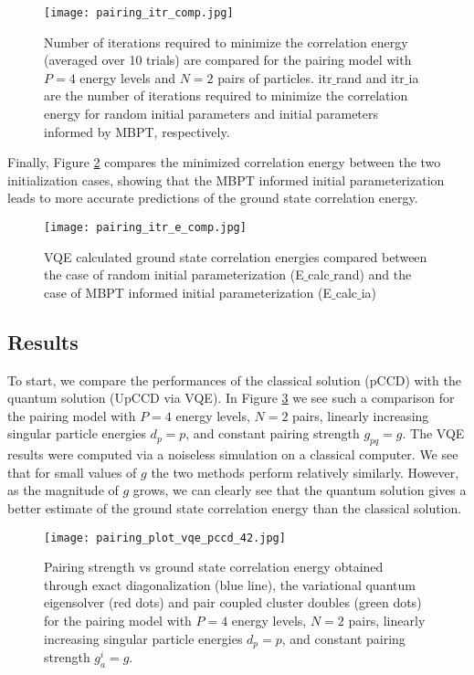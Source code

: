 \documentclass[Dual]{msu-thesis}
\begin{document}
\begin{figure}[H]
    \centering
    \texttt{[image: pairing\_itr\_comp.jpg]}
    \caption{Number of iterations required to minimize the correlation energy (averaged over 10 trials) are compared for the pairing model with $P=4$ energy levels and $N=2$ pairs of particles. itr$\_$rand and itr$\_$ia are the number of iterations required to minimize the correlation energy for random initial parameters and initial parameters informed by MBPT, respectively.}
    \label{fig:pairing_itr_comp}
\end{figure}

Finally, Figure \ref{fig:pairing_itr_e_comp} compares the minimized correlation energy between the two initialization cases, showing that the MBPT informed initial parameterization leads to more accurate predictions of the ground state correlation energy.

\begin{figure}[H]
    \centering
    \texttt{[image: pairing\_itr\_e\_comp.jpg]}
    \caption{VQE calculated ground state correlation energies compared between the case of random initial parameterization (E$\_$calc$\_$rand) and the case of MBPT informed initial parameterization (E$\_$calc$\_$ia)}
    \label{fig:pairing_itr_e_comp}
\end{figure}


\subsection{Results}

To start, we compare the performances of the classical solution (pCCD) with the quantum solution (UpCCD via VQE). In Figure \ref{fig:pairing_plot_vqe_pccd_42} we see such a comparison for the pairing model with $P=4$ energy levels, $N=2$ pairs, linearly increasing singular particle energies $d_p=p$, and constant pairing strength $g_{pq}=g$. The VQE results were computed via a noiseless simulation on a classical computer. We see that for small values of $g$ the two methods perform relatively similarly. However, as the magnitude of $g$ grows, we can clearly see that the quantum solution gives a better estimate of the ground state correlation energy than the classical solution.

\begin{figure}[t]
    \centering
    \texttt{[image: pairing\_plot\_vqe\_pccd\_42.jpg]}
    \caption
    {Pairing strength vs ground state correlation energy obtained through exact diagonalization (blue line), the variational quantum eigensolver (red dots) and pair coupled cluster doubles (green dots) for the pairing model with $P=4$ energy levels, $N=2$ pairs, linearly increasing singular particle energies $d_p=p$, and constant pairing strength $g^i_a=g$.}
    \label{fig:pairing_plot_vqe_pccd_42}
\end{figure}
\end{document}
